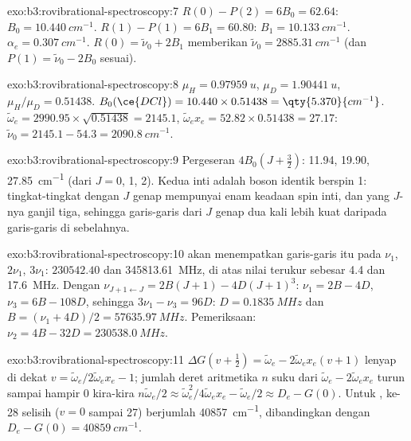 \begin{solution}{exo:b3:rovibrational-spectroscopy:7}
$R(0) - P(2) = 6B_0 = 62.64$: $B_0 = \qty{10.440}{cm^{-1}}$. $R(1) - P(1) = 6B_1 = 60.80$:
$B_1 = \qty{10.133}{cm^{-1}}$. $\alpha_e = \qty{0.307}{cm^{-1}}$. $R(0) = \tilde\nu_0 + 2B_1$
memberikan $\tilde\nu_0 = \qty{2885.31}{cm^{-1}}$ (dan $P(1) = \tilde\nu_0 - 2B_0$
sesuai).
\end{solution}

\begin{solution}{exo:b3:rovibrational-spectroscopy:8}
$\mu_H = \qty{0.97959}{u}$, $\mu_D = \qty{1.90441}{u}$, $\mu_H/\mu_D = 0.51438$. $B_0(\ce{DCl})
= 10.440 \times 0.51438 = \qty{5.370}{cm^{-1}}$. $\tilde\omega_e = 2990.95 \times \sqrt{0.51438}
= 2145.1$, $\tilde\omega_ex_e = 52.82 \times 0.51438 = 27.17$: $\tilde\nu_0 = 2145.1 - 54.3 =
\qty{2090.8}{cm^{-1}}$.
\end{solution}

\begin{solution}{exo:b3:rovibrational-spectroscopy:9}
Pergeseran $4B_0(J + \frac32)$: 11.94, 19.90, \qty{27.85}{cm^{-1}} (dari $J = 0$, 1, 2).
Kedua inti  adalah boson identik berspin 1: tingkat-tingkat dengan
$J$ genap mempunyai enam keadaan spin inti, dan yang $J$-nya ganjil tiga, sehingga
garis-garis dari $J$ genap dua kali lebih kuat daripada garis-garis di
sebelahnya.
\end{solution}

\begin{solution}{exo:b3:rovibrational-spectroscopy:10}
 akan menempatkan garis-garis itu pada $\nu_1$, $2\nu_1$, $3\nu_1$:
$230542.40$ dan \qty{345813.61}{MHz}, di atas nilai terukur sebesar 4.4 dan
\qty{17.6}{MHz}. Dengan $\nu_{J+1\leftarrow J} = 2B(J+1) - 4D(J+1)^3$: $\nu_1 = 2B - 4D$,
$\nu_3 = 6B - 108D$, sehingga $3\nu_1 - \nu_3 = 96D$: $D = \qty{0.1835}{MHz}$ dan
$B = (\nu_1 + 4D)/2 =
\qty{57635.97}{MHz}$. Pemeriksaan:
$\nu_2 = 4B - 32D = \qty{230538.0}{MHz}$.
\end{solution}

\begin{solution}{exo:b3:rovibrational-spectroscopy:11}
$\Delta G(v + \frac12) = \tilde\omega_e - 2\tilde\omega_ex_e(v+1)$ lenyap di dekat $v =
\tilde\omega_e/2\tilde\omega_ex_e - 1$; jumlah deret aritmetika $n$ suku dari
$\tilde\omega_e - 2\tilde\omega_ex_e$ turun sampai hampir 0 kira-kira $n\tilde\omega_e/2 \approx
\tilde\omega_e^2/4\tilde\omega_ex_e - \tilde\omega_e/2 \approx D_e - G(0)$. Untuk ,
ke-28 selisih ($v = 0$ sampai 27) berjumlah \qty{40857}{cm^{-1}}, dibandingkan
dengan $D_e - G(0) = \qty{40859}{cm^{-1}}$.
\end{solution}

